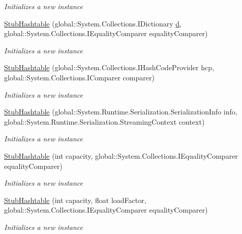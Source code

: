 \begin{DoxyCompactItemize}
\begin{DoxyCompactList}\small\item\em Initializes a new instance\end{DoxyCompactList}\item 
\hyperlink{class_system_1_1_collections_1_1_fakes_1_1_stub_hashtable_a7c4502a58c56fe0e4f3a7fec51ba9b58}{Stub\-Hashtable} (global\-::\-System.\-Collections.\-I\-Dictionary \hyperlink{bootstrap_8min_8js_aeb337d295abaddb5ec3cb34cc2e2bbc9}{d}, global\-::\-System.\-Collections.\-I\-Equality\-Comparer equality\-Comparer)
\begin{DoxyCompactList}\small\item\em Initializes a new instance\end{DoxyCompactList}\item 
\hyperlink{class_system_1_1_collections_1_1_fakes_1_1_stub_hashtable_a3bbf284d8ce065f99d5dd83c4d1796bc}{Stub\-Hashtable} (global\-::\-System.\-Collections.\-I\-Hash\-Code\-Provider hcp, global\-::\-System.\-Collections.\-I\-Comparer comparer)
\begin{DoxyCompactList}\small\item\em Initializes a new instance\end{DoxyCompactList}\item 
\hyperlink{class_system_1_1_collections_1_1_fakes_1_1_stub_hashtable_aaae767eaaaad698d672d4bf0c6e062a9}{Stub\-Hashtable} (global\-::\-System.\-Runtime.\-Serialization.\-Serialization\-Info info, global\-::\-System.\-Runtime.\-Serialization.\-Streaming\-Context context)
\begin{DoxyCompactList}\small\item\em Initializes a new instance\end{DoxyCompactList}\item 
\hyperlink{class_system_1_1_collections_1_1_fakes_1_1_stub_hashtable_acbe67a6fe14970422eaa09a83e229918}{Stub\-Hashtable} (int capacity, global\-::\-System.\-Collections.\-I\-Equality\-Comparer equality\-Comparer)
\begin{DoxyCompactList}\small\item\em Initializes a new instance\end{DoxyCompactList}\item 
\hyperlink{class_system_1_1_collections_1_1_fakes_1_1_stub_hashtable_a33e3858385b1fbc30ae4f2d3a0a72a47}{Stub\-Hashtable} (int capacity, float load\-Factor, global\-::\-System.\-Collections.\-I\-Equality\-Comparer equality\-Comparer)
\begin{DoxyCompactList}\small\item\em Initializes a new instance\end{DoxyCompactList}\item 

\end{DoxyCompactItemize}
